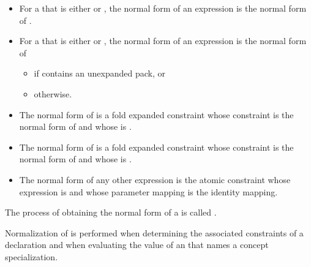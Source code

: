 \documentclass{wg21}
\begin{document}
\begin{itemize}
\item
For a 
that is either \tcode{\&\&} or \tcode{||},
the normal form of an expression
 is the normal form of
.

\item
For a 
that is either \tcode{\&\&} or \tcode{||},
the normal form of an expression
is the normal form of
\begin{itemize}
    \item
    if  contains an unexpanded pack, or
    \item
    otherwise.
\end{itemize}

\item
The normal form of  is
a fold expanded constraint
whose constraint is the normal form of  and
whose  is \tcode{\&\&}.

\item
The normal form of  is
a fold expanded constraint
whose constraint is the normal form of  and
whose  is \tcode{||}.

\item
The normal form of any other expression  is
the atomic constraint
whose expression is  and
whose parameter mapping is the identity mapping.
\end{itemize}

\pnum
The process of obtaining the normal form of a
is called
.
\begin{note}
    Normalization of 
    is performed
    when determining the associated constraints
    of a declaration
    and
    when evaluating the value of an 
    that names a concept specialization.
\end{note}
\end{document}
